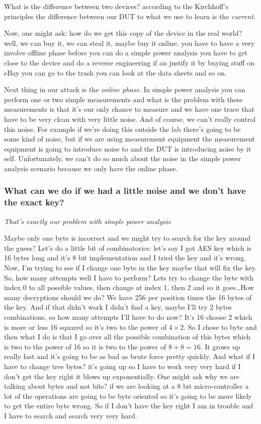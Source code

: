 What is the difference between two devices? according to the Kirchhoff's principles the difference between our DUT to what we use to learn is the \textit{current}. 
  
Now, one might ask: how do we get this copy of the device in the real world? well, we can buy it, we can steal it, maybe buy it online. you have to have a very involve offline phase before you can do a simple power analysis you have to get close to the device and do a reverse engineering if an justify it by buying stuff on eBay you can go to the trash you can look at the data sheets and so on.

Next thing in our attack is the \textit{online phase}.
In simple power analysis you can perform one or two simple measurements and what is the problem with these measurements  is that it's our only chance to measure and we have one trace that have to be very clean with very little noise. And of course, we can't really control this noise. For example if we're doing this outside the lab there's going to be some kind of noise, but if we are using measurement equipment the measurement equipment is going to introduce noise to and the DUT is introducing noise by it self. Unfortunately, we can't do so much about the noise in the simple power analysis scenario because we only have the online phase.

\subsubsection{What can we do if we had a little noise and we don't have the exact key?}

\textit{That's exactly our problem with simple power analysis}

Maybe only one byte is incorrect and we might try to search for the key around the guess? Let's do a little bit of combinatorics: let's say I got AES key which is 16 bytes long and it's 8 bit implementation and I tried the key and it's wrong. 
Now, I'm trying to see if I change one byte in the key maybe that will fix the key. So, how many attempts well I have to perform? Lets try to change the byte with index 0 to all possible values, then change at index 1, then 2 and so it goes\ldots How many decryptions should we do? We have 256 per position times the 16 bytes of the key. 
And if that didn't work I didn't find a key, maybe I'll try 2 bytes combinations, so how many attempts I'll have to do now? It's 16 choose 2 which is more or less 16 squared so it's two to the power of $4\times2$. So I chose to byte and then what I do is that I go over all the possible combination of this bytes which is two to the power of 16 so it is two to the power of $8+8=16$. It grows up really fast and it's going to be as bad as brute force pretty quickly. And what if I have to change tree bytes? it's going up so I have to work very very hard if I don't get the key right it blows up exponentially.
One might ask why we are talking about bytes and not bits? if we are looking at a 8 bit micro-controller a lot of the operations are going to be byte oriented so it's going to be more likely to get the entire byte wrong. So if I don't have the key right I am in trouble and I have to search and search very very hard. 

